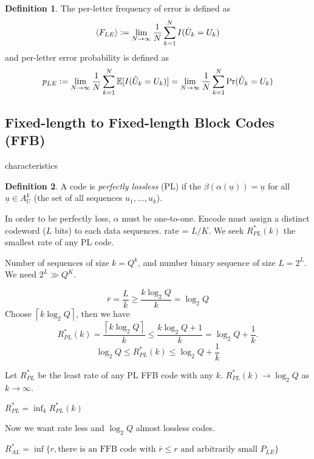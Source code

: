 \documentclass{report}
\newcommand{\defeq}{\vcentcolon=}
\theoremstyle{definition}
\newtheorem{definition}{Definition}[section]
\theoremstyle{remark}
\numberwithin{equation}{section}
\begin{document}
\begin{definition}
  The per-letter frequency of error is defined as \[
  \langle F_{LE}\rangle \defeq \lim_{N \to \infty} \frac{1}{N} \sum_{k=1}^N I(\hat{U}_k=U_k)
\]
  and per-letter error probability is defined as \[
  p_{LE} \defeq \lim_{N \to \infty} \frac{1}{N} \sum_{k=1}^N \mathbb{E}[I(\hat{U}_k=U_k)] = \lim_{N \to \infty} \frac{1}{N} \sum_{k=1}^N \Pr(\hat{U}_k=U_k)
\]
\end{definition}



\subsection{Fixed-length to Fixed-length Block Codes (FFB)}


characteristics

\begin{definition}
  A code is \emph{perfectly lossless} (PL) if the $\beta(\alpha(\underline{u})) = \underline{u}$ for all $\underline{u} \in A_U^k$ (the set of all sequences $u_1, \ldots, u_k$).
\end{definition}

In order to be perfectly loss, $\alpha$ must be one-to-one. Encode must assign a distinct codeword ($L$ bits) to each data sequences. rate = $L/K$.
We seek $R^*_{PL}(k)$ the smallest rate of any PL code.

Number of sequences of size $k = Q^k$, and number binary sequence of size $L = 2^L$. We need $2^L \gg Q^K$.

\[
\overline{r} = \frac{L}{k} \geq \frac{k\log_2Q}{k} = \log_2Q
\]
Choose $\left\lceil k\log_2Q\right\rceil$, then we have \[
  R^*_{PL}(k) = \frac{\left\lceil k\log_2Q\right\rceil}{k} \leq\frac{k\log_2Q + 1}{k} =\log_2 Q + \frac{1}{k}.
\]
\[
  \log_2 Q \leq R^*_{PL}(k) \leq \log_2 Q + \frac{1}{k}
\]

Let $R^*_{PL}$ be the least rate of any PL FFB code with any $k$. 
$R^*_{PL}(k) \to \log_2 Q$ as $k \to \infty$.

$R^*_{PL} = \inf_k R^*_{PL}(k)$

Now we want rate less and $\log_2 Q$ almost lossless codes.

$R^*_{AL} =  \inf \{r, \text{there is an FFB code with $\bar{r} \leq r$ and arbitrarily small $P_{LE}$}\}$
\end{document}
